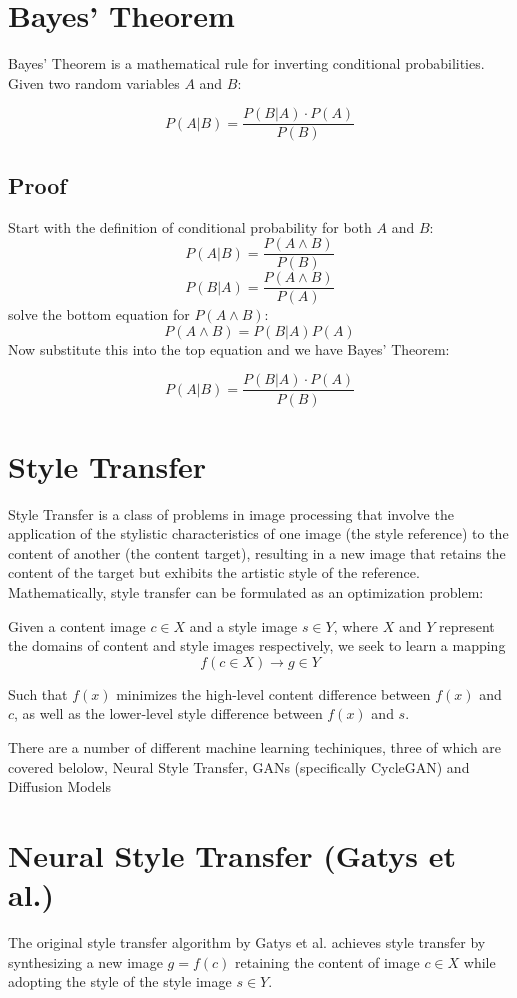 \documentclass[12pt]{article}
\begin{document}
\section{Bayes' Theorem}
Bayes' Theorem is a mathematical rule for inverting conditional probabilities. Given two random variables \(A\) and \(B\):

\[P(A|B) = \frac{P(B|A)\cdot P(A)}{P(B)}\]

\subsection{Proof}
Start with the definition of conditional probability for both \(A\) and \(B\):
\[P(A|B) = \frac{P(A \land B)}{P(B)}\]
\[P(B|A) = \frac{P(A \land B)}{P(A)}\]
solve the bottom equation for \(P(A \land B)\):
\[P(A \land B) = P(B|A)P(A)\]
Now substitute this into the top equation and we have Bayes' Theorem:

\[P(A|B) = \frac{P(B|A)\cdot P(A)}{P(B)}\]

\section{Style Transfer}
Style Transfer is a class of problems in image processing that involve the application of the stylistic characteristics of one image (the style reference) to the content of another (the content target), resulting in a new image that retains the content of the target but exhibits the artistic style of the reference. Mathematically, style transfer can be formulated as an optimization problem:

Given a content image \(c \in X\) and a style image \(s \in Y\), where \(X\) and \(Y\) represent the domains of content and style images respectively, we seek to learn a mapping \[f(c \in X) \rightarrow g \in Y\] 

Such that \(f(x)\) minimizes the high-level content difference between \(f(x)\) and \(c\), as well as the lower-level style difference between \(f(x)\) and \(s\).

There are a number of different machine learning techiniques, three of which are covered belolow, Neural Style Transfer, GANs (specifically CycleGAN) and Diffusion Models

\section{Neural Style Transfer (Gatys et al.)}

The original style transfer algorithm by Gatys et al. achieves style transfer 
by synthesizing a new image \(g = f(c)\) retaining the content of image \(c \in X\) while adopting the style of the style image \(s \in Y\). 
\end{document}
